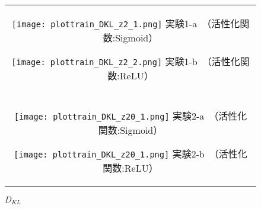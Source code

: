 \documentclass[12pt]{jsarticle}
\begin{document}
\begin{figure}[ht]
  \begin{center}
    \begin{tabular}{c}

      \begin{minipage}{0.5\hsize}
        \begin{center}
          \texttt{[image: plottrain\_DKL\_z2\_1.png]}
          \hspace{0.2cm} 実験1-a　（活性化関数:Sigmoid）
        \end{center}
      \end{minipage}

      \begin{minipage}{0.5\hsize}
        \begin{center}
          \texttt{[image: plottrain\_DKL\_z2\_2.png]}
        \hspace{0.2cm} 実験1-b　（活性化関数:ReLU）
        \end{center}
      \end{minipage}\\\\

      \begin{minipage}{0.5\hsize}
        \begin{center}
          \texttt{[image: plottrain\_DKL\_z20\_1.png]}
          \hspace{0.2cm} 実験2-a　（活性化関数:Sigmoid）
        \end{center}
      \end{minipage}

      \begin{minipage}{0.5\hsize}
        \begin{center}
          \texttt{[image: plottrain\_DKL\_z20\_1.png]}
          \hspace{0.2cm} 実験2-b　（活性化関数:ReLU）
        \end{center}
      \end{minipage}

    \end{tabular}
    \caption{$D_{KL}$}
     \label{fig:DKL2}
  \end{center}
\end{figure}
\end{document}
